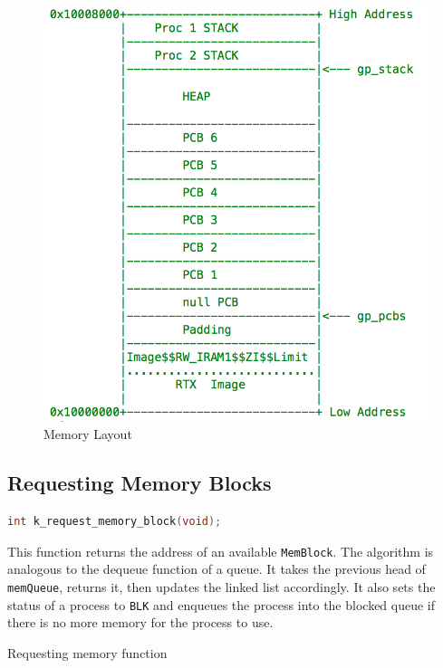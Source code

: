 \documentclass[12pt]{report}
\begin{document}
\begin{figure}[h!]
  \centering
	\includegraphics{memory.png}
\caption{Memory Layout}

\end{figure}

\subsection{Requesting Memory Blocks}

\begin{minipage}{\textwidth}
\begin{lstlisting}[language=C, frame=single]
int k_request_memory_block(void);
\end{lstlisting}
\end{minipage}

This function returns the address of an available \texttt{MemBlock}. The algorithm is analogous to the dequeue function of a queue. It takes the previous head of \texttt{memQueue}, returns it, then updates the linked list accordingly.  It also sets the status of a process to \texttt{BLK} and enqueues the process into the blocked queue if there is no more memory for the process to use.

\begin{algorithm}[H]
  \caption{Requesting memory function}
  \begin{algorithmic}[1]
	  \EndWhile
    \EndProcedure
  \end{algorithmic}
\end{algorithm}
\end{document}
